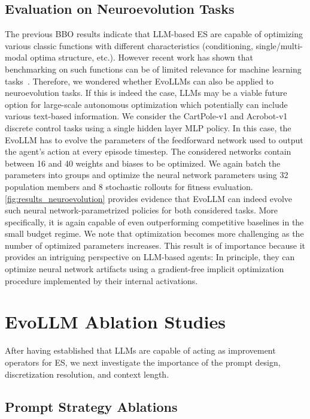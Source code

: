 \subsection{Evaluation on Neuroevolution Tasks}

The previous BBO results indicate that LLM-based ES are capable of optimizing various classic functions with different characteristics (conditioning, single/multi-modal optima structure, etc.). However recent work has shown that benchmarking on such functions can be of limited relevance for machine learning tasks~\cite{lange2023neuroevobench}. Therefore, we wondered whether EvoLLMs can also be applied to neuroevolution tasks. If this is indeed the case, LLMs may be a viable future option for large-scale autonomous optimization which potentially can include various text-based information.
%
We consider the CartPole-v1 and Acrobot-v1 discrete control tasks using a single hidden layer MLP policy. In this case, the EvoLLM has to evolve the parameters of the feedforward network used to output the agent's action at every episode timestep. The considered networks contain between 16 and 40 weights and biases to be optimized. We again batch the parameters into groups and optimize the neural network parameters using 32 population members and 8 stochastic rollouts for fitness evaluation.
%
\cref{fig:results_neuroevolution} provides evidence that EvoLLM can indeed evolve such neural network-parametrized policies for both considered tasks. More specifically, it is again capable of even outperforming competitive baselines in the small budget regime.
%
We note that optimization becomes more challenging as the number of optimized parameters increases.
%
This result is of importance because it provides an intriguing perspective on LLM-based agents: In principle, they can optimize neural network artifacts using a gradient-free implicit optimization procedure implemented by their internal activations. 

\section{EvoLLM Ablation Studies}

After having established that LLMs are capable of acting as improvement operators for ES, we next investigate the importance of the prompt design, discretization resolution, and context length.

\subsection{Prompt Strategy Ablations}

